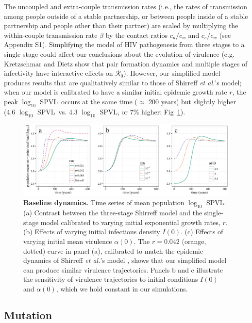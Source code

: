 \documentclass[10pt,letterpaper]{article}
\renewcommand{\figurename}{Fig}
\newcommand{\Lspvl}{$\log_{10}$ SPVL}
\newcommand{\rzero}{{\mathcal R}_0}
\newcommand{\etal}{\textit{et al.}}
\begin{document}
The uncoupled and extra-couple transmission rates (i.e., the rates of
transmission among people outside of a stable partnership, or between
people inside of a stable partnership and people other than their
partner) are scaled by
multiplying the within-couple transmission rate $\beta$ by the contact
ratios $c_u/c_w$ and $c_e/c_w$ (see Appendix S1). Simplifying the model
of HIV pathogenesis from three stages to a single stage could affect
our conclusions about the evolution of virulence (e.g. Kretzschmar and
Dietz \cite{kretzschmar_effect_1998} show that pair formation dynamics
and multiple stages of infectivity have interactive effects on
$\rzero$). However, our simplified model produces results that are
qualitatively similar to those of Shirreff \etal's
\cite{shirreff_transmission_2011} model; when our model is calibrated
to have a similar initial epidemic growth rate $r$, the peak
\Lspvl\ occurs at the same time ($\approx$ 200 years) but slightly
higher (4.6 \Lspvl\ vs. 4.3 \Lspvl, or 7\% higher: \figurename~\ref{fig:panel3}).

\begin{figure}[!ht]
\includegraphics[width=\textwidth]{../figures/fig1.pdf}
\caption{{\bf Baseline dynamics.}
Time series of mean population \Lspvl. (a) Contrast between the three-stage Shirreff model and the single-stage model calibrated to varying initial exponential growth rates, $r$. (b) Effects of varying initial infectious density $I(0)$. (c) Effects of varying initial mean virulence $\alpha(0)$. The $r=0.042$ (orange, dotted) curve in panel (a), calibrated to match the epidemic dynamics of Shirreff \etal's model \cite{shirreff_transmission_2011}, shows that our simplified model can produce similar virulence trajectories. Panels b and c illustrate the sensitivity of virulence trajectories to initial conditions $I(0)$ and $\alpha(0)$, which we hold constant in our simulations.}
\label{fig:panel3}
\end{figure}

\subsection*{Mutation}
\end{document}
